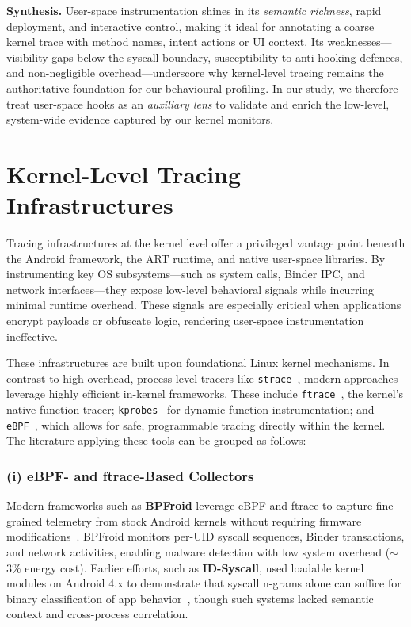 \documentclass[a4paper,12pt]{report}
\begin{document}
\medskip
\noindent\textbf{Synthesis.}
User-space instrumentation shines in its \emph{semantic richness}, rapid deployment, and interactive control, making it ideal for annotating a coarse kernel trace with method names, intent actions or UI context. Its weaknesses—visibility gaps below the syscall boundary, susceptibility to anti-hooking defences, and non-negligible overhead—underscore why kernel-level tracing remains the authoritative foundation for our behavioural profiling. In our study, we therefore treat user-space hooks as an \emph{auxiliary lens} to validate and enrich the low-level, system-wide evidence captured by our kernel monitors.

\section{Kernel-Level Tracing Infrastructures}
\label{sec:rw:kernel}

Tracing infrastructures at the kernel level offer a privileged vantage point beneath the Android framework, the ART runtime, and native user-space libraries. By instrumenting key OS subsystems—such as system calls, Binder IPC, and network interfaces—they expose low-level behavioral signals while incurring minimal runtime overhead. These signals are especially critical when applications encrypt payloads or obfuscate logic, rendering user-space instrumentation ineffective.

These infrastructures are built upon foundational Linux kernel mechanisms. In contrast to high-overhead, process-level tracers like \texttt{strace}~\cite{strace2023}, modern approaches leverage highly efficient in-kernel frameworks. These include \texttt{ftrace}~\cite{ftrace2023}, the kernel's native function tracer; \texttt{kprobes}~\cite{kprobes2023} for dynamic function instrumentation; and \texttt{eBPF}~\cite{ebpf2023}, which allows for safe, programmable tracing directly within the kernel. The literature applying these tools can be grouped as follows:

\subsubsection*{(i) eBPF- and ftrace-Based Collectors}
Modern frameworks such as \textbf{BPFroid} leverage eBPF and ftrace to capture fine-grained telemetry from stock Android kernels without requiring firmware modifications~\cite{BPFroid2021}. BPFroid monitors per-UID syscall sequences, Binder transactions, and network activities, enabling malware detection with low system overhead ($\sim$3\% energy cost). Earlier efforts, such as \textbf{ID-Syscall}, used loadable kernel modules on Android 4.x to demonstrate that syscall n-grams alone can suffice for binary classification of app behavior~\cite{Schmidt2009IDSyscall}, though such systems lacked semantic context and cross-process correlation.
\end{document}
